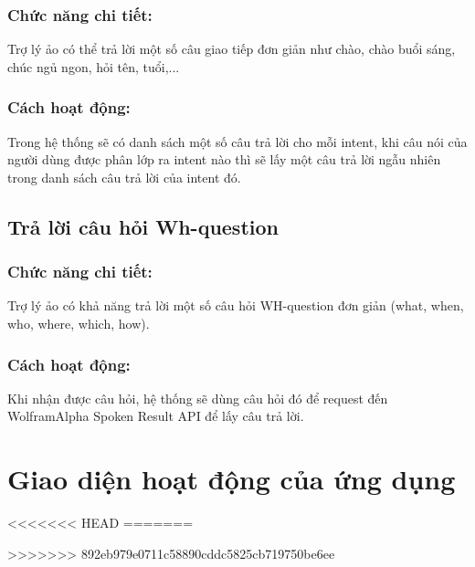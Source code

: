 \subsubsection{Chức năng chi tiết:}

Trợ lý ảo có thể trả lời một số câu giao tiếp đơn giản như chào, chào buổi sáng, chúc ngủ ngon, hỏi tên, tuổi,...

\subsubsection{Cách hoạt động:}

Trong hệ thống sẽ có danh sách một số câu trả lời cho mỗi intent, khi câu nói của người dùng được phân lớp ra intent nào thì sẽ lấy một câu trả lời ngẫu nhiên trong danh sách câu trả lời của intent đó.

\subsection{Trả lời câu hỏi Wh-question}

\subsubsection{Chức năng chi tiết:}

Trợ lý ảo có khả năng trả lời một số câu hỏi WH-question đơn giản (what, when, who, where, which, how).

\subsubsection{Cách hoạt động:}

Khi nhận được câu hỏi, hệ thống sẽ dùng câu hỏi đó để request đến WolframAlpha Spoken Result API để lấy câu trả lời.

\section{Giao diện hoạt động của ứng dụng}
<<<<<<< HEAD
=======

>>>>>>> 892eb979e0711c58890cddc5825cb719750be6ee
